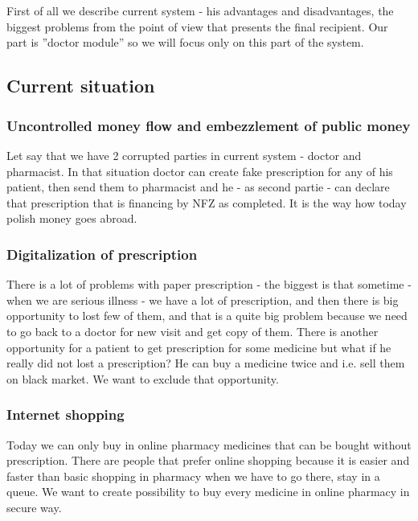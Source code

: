 
\newpage

\chapter {}
First of all we describe current system - his advantages and disadvantages, the biggest problems from the point of view that presents the final recipient. Our part is ''doctor module'' so we will focus only on this part of the system. 
\section{Current situation}
\subsection{Uncontrolled money flow and embezzlement of public money}
Let say that we have 2 corrupted parties in current system - doctor and pharmacist. In that situation doctor can create fake prescription for any of his patient, then send them to pharmacist and he - as second partie - can declare that prescription that is financing by NFZ as completed. It is the way how today polish money goes abroad. 

\subsection{Digitalization of prescription}
There is a lot of problems with paper prescription - the biggest is that sometime - when we are serious illness - we have a lot of prescription, and then there is big opportunity to lost few of them, and that is a quite big problem because we need to go back to a doctor for new visit and get copy of them. There is another opportunity for a patient to get prescription for some medicine but what if he really did not lost a prescription? He can buy a medicine twice and i.e. sell them on black market. We want to exclude that opportunity.

\subsection{Internet shopping}
Today we can only buy in online pharmacy medicines that can be bought without prescription. There are people that prefer online shopping because it is easier and faster than basic shopping in pharmacy when we have to go there, stay in a queue. We want to create possibility to buy every medicine in online pharmacy in secure way.

